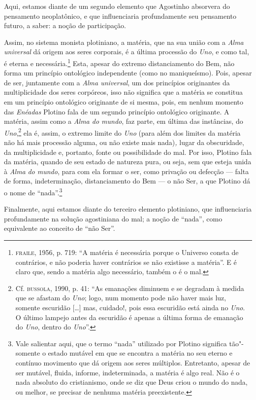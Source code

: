 Aqui, estamos diante de um segundo elemento que Agostinho
absorvera do pensamento neoplatônico, e que influenciaria 
profundamente seu pensamento futuro, a saber: a noção de
participação. 

Assim, no sistema monista plotiniano,  a matéria,  que na sua
união com a \emph{Alma} \emph{universal} dá origem aos seres
corporais, é a última processão do \emph{Uno}, e como tal, é
eterna e necessária.\footnote{ \textsc{fraile}, 1956, p. 719: “A matéria é
necessária porque o Universo consta de contrários, e não poderia
haver contrários  se não existisse a matéria”. E é claro que,
sendo a matéria algo necessário,  também o é o mal.} Esta,
apesar do extremo distanciamento do Bem, não forma um princípio
ontológico independente (como no maniqueísmo). Pois, apesar de
ser, juntamente com a \emph{Alma universal}, um dos princípios
originantes da multiplicidade dos seres corpóreos, isso não
significa que a matéria se constitua em um princípio ontológico
originante de si mesma, pois, em nenhum momento das
\emph{Enéadas} Plotino fala de um segundo princípio
ontológico originante.  A matéria, assim como  a \emph{Alma do
mundo}, faz parte, em última das instâncias, do
\emph{Uno},\footnote{ Cf. \textsc{bussola}, 1990, p. 41: “As emanações
diminuem e se degradam à medida que se afastam do \emph{Uno};
logo, num momento pode não haver mais luz, somente escuridão
[\ldots{}] mas, cuidado!, pois essa escuridão está ainda no
\emph{Uno}. O último lampejo antes  da escuridão  é apenas a
última forma de emanação do \emph{Uno}, dentro do
\emph{Uno}”.} ela é,  assim, o extremo limite do \emph{Uno}
(para além dos limites da matéria não há mais processão alguma,
ou não existe mais nada)\emph{,} lugar da obscuridade, da
multiplicidade e, portanto, fonte ou possibilidade do mal. Por
isso, Plotino fala da matéria, quando de seu estado de natureza
pura, ou seja, sem que esteja unida à \emph{Alma} \emph{do
mundo}, para com ela formar o ser, como privação ou defecção ---
falta de forma, indeterminação,  distanciamento do Bem --- o
não Ser, a que Plotino dá o nome de “nada”.\footnote{ Vale 
salientar aqui, que o termo “nada”  utilizado por Plotino
significa tão"-somente o estado mutável em que se encontra a
matéria no seu  eterno e contínuo movimento que dá origem aos
seres múltiplos. Entretanto, apesar de ser mutável, fluida,
informe, indeterminada, a matéria é algo real.  Não é o nada
absoluto do cristianismo,  onde se diz que Deus criou o mundo do
nada, ou melhor, se precisar de nenhuma matéria preexistente.} 

Finalmente, aqui estamos diante do terceiro elemento plotiniano,
que influenciaria profundamente na solução agostiniana do mal; a
noção de “nada”, como equivalente  ao conceito de “não Ser”.

